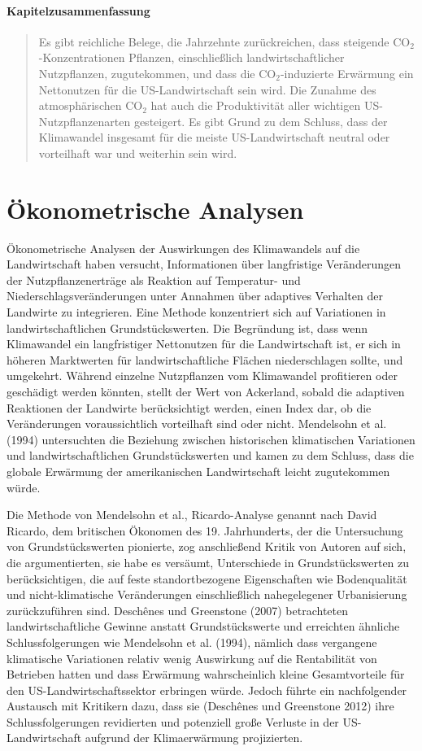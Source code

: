 \documentclass[12pt,paper=a4,DIV=12,parskip=never,chapterprefix=false,headings=standardclasses]{scrreprt}
\begin{document}
\paragraph{Kapitelzusammenfassung}
\begin{quote}
Es gibt reichliche Belege, die Jahrzehnte zurückreichen, dass steigende CO$_2$-Konzentrationen Pflanzen, einschließlich landwirtschaftlicher Nutzpflanzen, zugutekommen, und dass die CO$_2$-induzierte Erwärmung ein Nettonutzen für die US-Landwirtschaft sein wird. Die Zunahme des atmosphärischen CO$_2$ hat auch die Produktivität aller wichtigen US-Nutzpflanzenarten gesteigert. Es gibt Grund zu dem Schluss, dass der Klimawandel insgesamt für die meiste US-Landwirtschaft neutral oder vorteilhaft war und weiterhin sein wird.
\end{quote}
\section{Ökonometrische Analysen}
Ökonometrische Analysen der Auswirkungen des Klimawandels auf die Landwirtschaft haben versucht, Informationen über langfristige Veränderungen der Nutzpflanzenerträge als Reaktion auf Temperatur- und Niederschlagsveränderungen unter Annahmen über adaptives Verhalten der Landwirte zu integrieren. Eine Methode konzentriert sich auf Variationen in landwirtschaftlichen Grundstückswerten. Die Begründung ist, dass wenn Klimawandel ein langfristiger Nettonutzen für die Landwirtschaft ist, er sich in höheren Marktwerten für landwirtschaftliche Flächen niederschlagen sollte, und umgekehrt. Während einzelne Nutzpflanzen vom Klimawandel profitieren oder geschädigt werden könnten, stellt der Wert von Ackerland, sobald die adaptiven Reaktionen der Landwirte berücksichtigt werden, einen Index dar, ob die Veränderungen voraussichtlich vorteilhaft sind oder nicht.
Mendelsohn et al. (1994) untersuchten die Beziehung zwischen historischen klimatischen Variationen und landwirtschaftlichen Grundstückswerten und kamen zu dem Schluss, dass die globale Erwärmung der amerikanischen Landwirtschaft leicht zugutekommen würde.

Die Methode von Mendelsohn et al., Ricardo-Analyse genannt nach David Ricardo, dem britischen Ökonomen des 19. Jahrhunderts, der die Untersuchung von Grundstückswerten pionierte, zog anschließend Kritik von Autoren auf sich, die argumentierten, sie habe es versäumt, Unterschiede in Grundstückswerten zu berücksichtigen, die auf feste standortbezogene Eigenschaften wie Bodenqualität und nicht-klimatische Veränderungen einschließlich nahegelegener Urbanisierung zurückzuführen sind. Deschênes und Greenstone (2007) betrachteten landwirtschaftliche Gewinne anstatt Grundstückswerte und erreichten ähnliche Schlussfolgerungen wie Mendelsohn et al. (1994), nämlich dass vergangene klimatische Variationen relativ wenig Auswirkung auf die Rentabilität von Betrieben hatten und dass Erwärmung wahrscheinlich kleine Gesamtvorteile für den US-Landwirtschaftssektor erbringen würde. Jedoch führte ein nachfolgender Austausch mit Kritikern dazu, dass sie (Deschênes und Greenstone 2012) ihre Schlussfolgerungen revidierten und potenziell große Verluste in der US-Landwirtschaft aufgrund der Klimaerwärmung projizierten.
\end{document}
